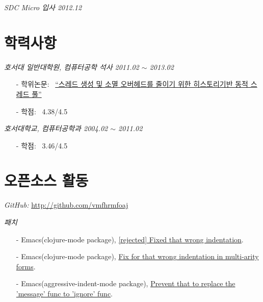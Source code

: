 \documentclass[line,margin]{res}
\begin{document}
\begin{resume}
  {\sl SDC Micro 입사 \hfill 2012.12}
  \vspace{0mm}


  \section{학력사항}

  {\sl 호서대 일반대학원, 컴퓨터공학 석사 \hfill 2011.02 $\sim$ 2013.02}
  \vspace{-4mm}
  {
    \small
    \begin{itemize}
    \item[-] 학위논문: ~\href{http://dlibrary.hoseo.ac.kr/search/DetailView.ax?sid=4&cid=950591}
      {``스레드 생성 및 소멸 오버헤드를 줄이기 위한 히스토리기반 동적 스레드 풀''}
      \vspace{-1mm}
    \item[-] 학점: ~4.38/4.5
    \end{itemize}
  }

  {\sl 호서대학교, 컴퓨터공학과 \hfill 2004.02 $\sim$ 2011.02}
  \vspace{-4mm}
  {
    \small
    \begin{itemize}
    \item[-] 학점: ~3.46/4.5
    \end{itemize}
  }


  \section{오픈소스 활동}

  {\sl GitHub:} \href{http://github.com/vmfhrmfoaj/}{http://github.com/vmfhrmfoaj}

  {\sl 패치}
  \vspace{-4mm}
  {
    \small
    \begin{itemize}
    \item[-] Emacs({\footnotesize clojure-mode package}),
      \href{https://github.com/clojure-emacs/clojure-mode/pull/263}
      {\textcolor[gray]{0.5}{[rejected]} Fixed that wrong indentation}.
    \item[-] Emacs({\footnotesize clojure-mode package}),
      \href{https://github.com/clojure-emacs/clojure-mode/pull/257}
      {Fix for that wrong indentation in multi-arity forms}.
    \item[-] Emacs({\footnotesize aggressive-indent-mode package}),
      \href{https://github.com/Bruce-Connor/aggressive-indent-mode/pull/30}
      {Prevent that to replace the 'message' func to 'ignore' func}.
    \end{itemize}
  }


\end{resume}
\end{document}
